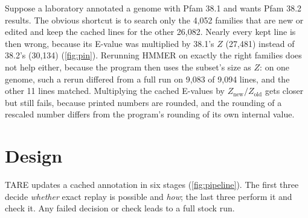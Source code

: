 \documentclass[letterpaper,twocolumn,10pt]{article}
\theoremstyle{definition}
\newcommand{\sys}{TARE\xspace}
\newcommand{\sys}{PARE\xspace}
\begin{document}
Suppose a laboratory annotated a genome with Pfam 38.1 and wants Pfam 38.2 results. The obvious shortcut is to
search only the 4{,}052 families that are new or edited and keep the cached lines for the other 26{,}082. Nearly
every kept line is then wrong, because its E-value was multiplied by 38.1's $Z$ (27{,}481) instead of 38.2's
(30{,}134) (\cref{fig:pin}). Rerunning HMMER on exactly the right families does not help either, because the program
then uses the subset's size as $Z$: on one genome, such a rerun differed from a full run on 9{,}083 of 9{,}094 lines,
and the other 11 lines matched. Multiplying the cached E-values by
$Z_{\text{new}}/Z_{\text{old}}$ gets closer but still fails, because printed numbers are rounded, and the rounding of
a rescaled number differs from the program's rounding of its own internal value.



\section{Design}
\label{sec:design}

\sys updates a cached annotation in six stages (\cref{fig:pipeline}). The first three decide \textit{whether} exact
replay is possible and \textit{how}; the last three perform it and check it. Any failed decision or check leads to a
full stock run.
\end{document}
